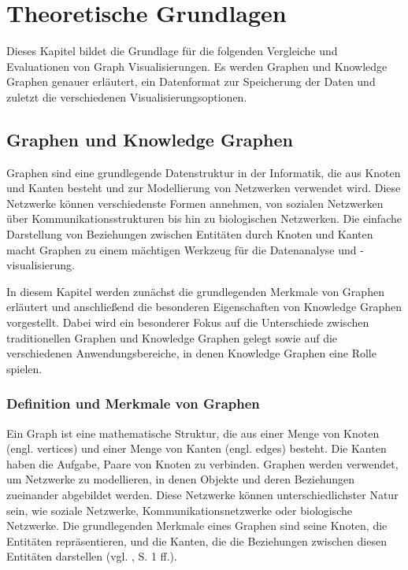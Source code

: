
\chapter{Theoretische Grundlagen}
\label{theory}

Dieses Kapitel bildet die Grundlage für die folgenden Vergleiche und Evaluationen von Graph Visualisierungen. Es werden Graphen und Knowledge Graphen genauer erläutert, ein Datenformat zur Speicherung der Daten und zuletzt die verschiedenen Visualisierungsoptionen. 

\section{Graphen und Knowledge Graphen}

Graphen sind eine grundlegende Datenstruktur in der Informatik, die aus Knoten und Kanten besteht und zur Modellierung von Netzwerken verwendet wird. Diese Netzwerke können verschiedenste Formen annehmen, von sozialen Netzwerken über Kommunikationsstrukturen bis hin zu biologischen Netzwerken. Die einfache Darstellung von Beziehungen zwischen Entitäten durch Knoten und Kanten macht Graphen zu einem mächtigen Werkzeug für die Datenanalyse und -visualisierung.

In diesem Kapitel werden zunächst die grundlegenden Merkmale von Graphen erläutert und anschließend die besonderen Eigenschaften von Knowledge Graphen vorgestellt. Dabei wird ein besonderer Fokus auf die Unterschiede zwischen traditionellen Graphen und Knowledge Graphen gelegt sowie auf die verschiedenen Anwendungsbereiche, in denen Knowledge Graphen eine Rolle spielen.

\subsection{Definition und Merkmale von Graphen}

Ein Graph ist eine mathematische Struktur, die aus einer Menge von Knoten (engl. vertices) und einer Menge von Kanten (engl. edges) besteht. Die Kanten haben die Aufgabe, Paare von Knoten zu verbinden. Graphen werden verwendet, um Netzwerke zu modellieren, in denen Objekte und deren Beziehungen zueinander abgebildet werden. Diese Netzwerke können unterschiedlichster Natur sein, wie soziale Netzwerke, Kommunikationsnetzwerke oder biologische Netzwerke. Die grundlegenden Merkmale eines Graphen sind seine Knoten, die Entitäten repräsentieren, und die Kanten, die die Beziehungen zwischen diesen Entitäten darstellen (vgl. \cite{graphIntroduction:Wilson}, S. 1 ff.).


